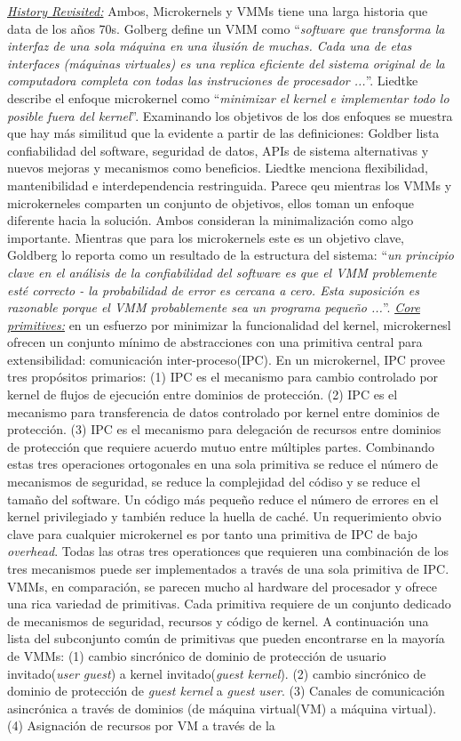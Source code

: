 \underline{\emph{History Revisited:}} Ambos, Microkernels y VMMs tiene una larga historia que data de los años 70s. Golberg define un VMM como ``\emph{software que transforma la interfaz de una sola máquina en una ilusión de muchas. Cada una de etas interfaces (máquinas virtuales)  es una replica eficiente del sistema original de la computadora completa con todas las instruciones de procesador ...}''. Liedtke describe el enfoque microkernel como ``\emph{minimizar el kernel e implementar todo lo posible fuera del kernel}''. Examinando los objetivos de los dos enfoques se muestra que hay más similitud que la evidente a partir de las definiciones: Goldber lista confiabilidad del software, seguridad de datos, APIs de sistema alternativas y nuevos mejoras y mecanismos como beneficios. Liedtke menciona flexibilidad, mantenibilidad e interdependencia restringuida. Parece qeu mientras los VMMs y microkerneles comparten un conjunto de objetivos, ellos toman un enfoque diferente hacia la solución. Ambos consideran la minimalización como algo importante. Mientras que para los microkernels este es un objetivo clave, Goldberg lo reporta como un resultado de la estructura del sistema: ``\emph{un principio clave en el análisis de la confiabilidad del software es que el VMM problemente esté correcto - la probabilidad de error es cercana a cero. Esta suposición es razonable porque el VMM probablemente sea un programa pequeño ...}''. \underline{\emph{Core primitives:}} en un esfuerzo por minimizar la funcionalidad del kernel, microkernesl ofrecen un conjunto mínimo de abstracciones con una primitiva central para extensibilidad: comunicación inter-proceso(IPC). En un microkernel, IPC provee tres propósitos primarios: (1) IPC es el mecanismo para cambio controlado por kernel de flujos de ejecución entre dominios de protección. (2) IPC es el mecanismo para transferencia de datos controlado por kernel entre dominios de protección. (3) IPC es el mecanismo para delegación de recursos entre dominios de protección que requiere acuerdo mutuo entre múltiples partes. Combinando estas tres operaciones ortogonales en una sola primitiva se reduce el número de mecanismos de seguridad, se reduce la complejidad del códiso y se reduce el tamaño del software. Un código más pequeño reduce el número de errores en el kernel privilegiado y también reduce la huella de caché. Un requerimiento obvio clave para cualquier microkernel es por tanto una primitiva de IPC de bajo \emph{overhead}. Todas las otras tres operationces que requieren una combinación de los tres mecanismos puede ser implementados a través de una sola primitiva de IPC. VMMs, en comparación, se parecen mucho al hardware del procesador y ofrece una rica variedad de primitivas. Cada primitiva requiere de un conjunto dedicado de mecanismos de seguridad, recursos y código de kernel. A continuación una lista del subconjunto común de primitivas que pueden encontrarse en la mayoría de VMMs: (1) cambio sincrónico de dominio de protección de usuario invitado(\emph{user guest}) a kernel invitado(\emph{guest kernel}). (2) cambio sincrónico de dominio de protección de \emph{guest kernel} a \emph{guest user}. (3) Canales de comunicación asincrónica a través de dominios (de máquina virtual(VM) a máquina virtual). (4) Asignación de recursos por VM a través de la 